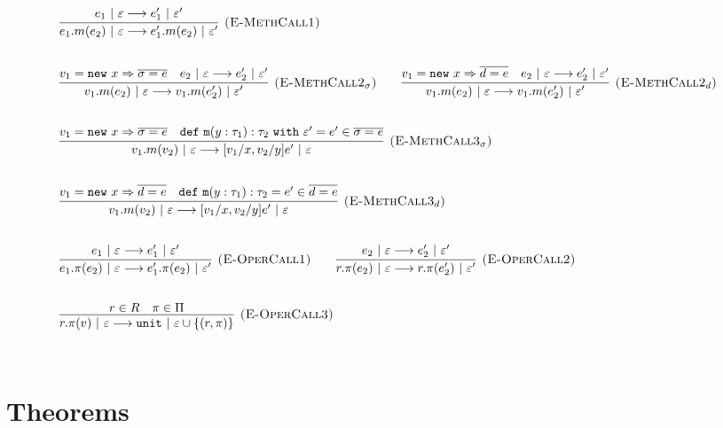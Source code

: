 \documentclass{llncs}
\newcommand{\keywadj}[1]{\mathtt{#1}}
\newcommand{\keyw}[1]{\keywadj{#1}~}
\begin{document}
\[
\begin{array}{lll}
	\infer[\textsc{(E-MethCall1)}]
		{e_1.m(e_2)~|~\varepsilon \longrightarrow e_1'.m(e_2)~|~\varepsilon'}
		{e_1~|~\varepsilon \longrightarrow e_1'~|~\varepsilon'}\\[5ex]

	\infer[\textsc{(E-MethCall2$_{\sigma}$)}]
		{v_1.m(e_2)~|~\varepsilon \longrightarrow v_1.m(e_2')~|~\varepsilon'}
		{v_1 = \keywadj{new}~x \Rightarrow \overline{\sigma = e} & e_2~|~\varepsilon \longrightarrow e_2'~|~\varepsilon'}
				
		~~~~~~
	\infer[\textsc{(E-MethCall2$_d$)}]
		{v_1.m(e_2)~|~\varepsilon \longrightarrow v_1.m(e_2')~|~\varepsilon'}
		{v_1 = \keywadj{new}~x \Rightarrow \overline{d = e} & e_2~|~\varepsilon \longrightarrow e_2'~|~\varepsilon'}
		\\[5ex]
		
	\infer[\textsc{(E-MethCall3$_{\sigma}$)}]
		{v_1.m(v_2)~|~\varepsilon
			\longrightarrow
		 [v_1/x, v_2/y]e'~|~\varepsilon}
  		{v_1 = \keywadj{new}~x \Rightarrow \overline{\sigma = e} & \keywadj{def~m}(y: \tau_1) : \tau_2~\keyw{with} \varepsilon' = e' \in \overline {\sigma = e}} \\[5ex]

	\infer[\textsc{(E-MethCall3$_{d}$)}]
		{v_1.m(v_2)~|~\varepsilon
			\longrightarrow
		 [v_1/x, v_2/y]e'~|~\varepsilon}
  		{v_1 = \keywadj{new}~x \Rightarrow \overline{d = e} & \keywadj{def~m}(y: \tau_1) : \tau_2 = e' \in \overline {d = e}} \\[5ex]
			
	\infer[\textsc{(E-OperCall1)}]
		{e_1.\pi(e_2)~|~\varepsilon
			\longrightarrow
		 e_1'.\pi(e_2)~|~\varepsilon'}
		{e_1~|~\varepsilon \longrightarrow e_1'~|~\varepsilon'}
~~~~~~
			\infer[\textsc{(E-OperCall2)}]
		{r.\pi(e_2)~|~\varepsilon
			\longrightarrow
		 r.\pi(e_2')~|~\varepsilon'}
		{e_2~|~\varepsilon \longrightarrow e_2'~|~\varepsilon'} \\[5ex]
			
			\infer[\textsc{(E-OperCall3)}]
		{r.\pi(v)~|~\varepsilon
			\longrightarrow
		 \keywadj{unit}~|~\varepsilon \cup \{(r, \pi)\}}
		{r \in R & \pi \in \Pi} \\[5ex]
			
		
\end{array}
\]

\newpage


\section{Theorems}
\end{document}
